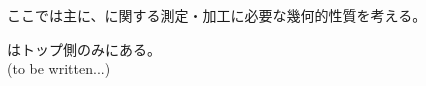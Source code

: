 

ここでは主に、\textbf{\IncutBoring}に関する測定・加工に必要な幾何的性質を考える。



\IncutBoring はトップ側のみにある。\\
(to be written...)
